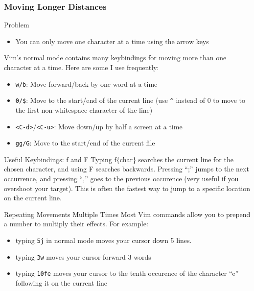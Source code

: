 \documentclass{beamer}
\begin{document}
\begin{frame}[fragile]
    \frametitle{Moving Longer Distances}
    \small
    \begin{block}{Problem}
	\begin{itemize}
	    \item You can only move one character at a time using the arrow keys
	\end{itemize}
    \end{block}
    Vim's normal mode contains many keybindings for moving more than one character at a time. Here are some I use frequently:
    \begin{itemize}
	\item \verb+w/b+:  Move forward/back by one word at a time
	\item \verb+0/$+:  Move to the start/end of the current line (use \verb+^+ instead of 0 to move to the first non-whitespace character of the line)
	\item \verb+<C-d>+/\verb+<C-u>+:  Move down/up by half a screen at a time
	\item \verb+gg/G+:  Move to the start/end of the current file
    \end{itemize}
    \begin{block}{Useful Keybindings: f and F}
	Typing f\{char\} searches the current line for the chosen character, and using F searches backwards. Pressing \enquote{;} jumps to the next occurrence, and pressing \enquote{,} goes to the previous occurence (very useful if you overshoot your target). This is often the fastest way to jump to a specific location on the current line.
    \end{block}
\end{frame}

\begin{frame}[fragile]
    \small
    \begin{block}{Repeating Movements Multiple Times}
	Most Vim commands allow you to prepend a number to multiply their effects. For example:
	\begin{itemize}
	    \item typing \verb+5j+ in normal mode moves your cursor down 5 lines.
	    \item typing \verb+3w+ moves your cursor forward 3 words
	    \item typing \verb+10fe+ moves your cursor to the tenth occurence of the character \enquote{e} following it on the current line
	\end{itemize}
    \end{block}
\end{frame}
\end{document}
